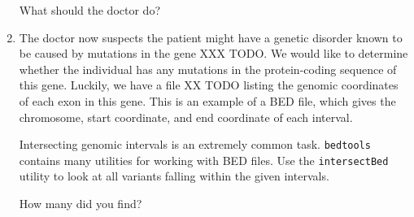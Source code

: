 \documentclass[12pt]{article}
\begin{document}
\begin{enumerate}
What should the doctor do?

\item The doctor now suspects the patient might have a genetic disorder known to be caused by mutations in the gene XXX TODO. We would like to determine whether the individual has any mutations in the protein-coding sequence of this gene. Luckily, we have a file XX TODO listing the genomic coordinates of each exon in this gene. This is an example of a BED file, which gives the chromosome, start coordinate, and end coordinate of each interval.

Intersecting genomic intervals is an extremely common task. \texttt{bedtools} contains many utilities for working with BED files. Use the \texttt{intersectBed} utility to look at all variants falling within the given intervals.

How many did you find? 

\end{enumerate}
\end{document}
